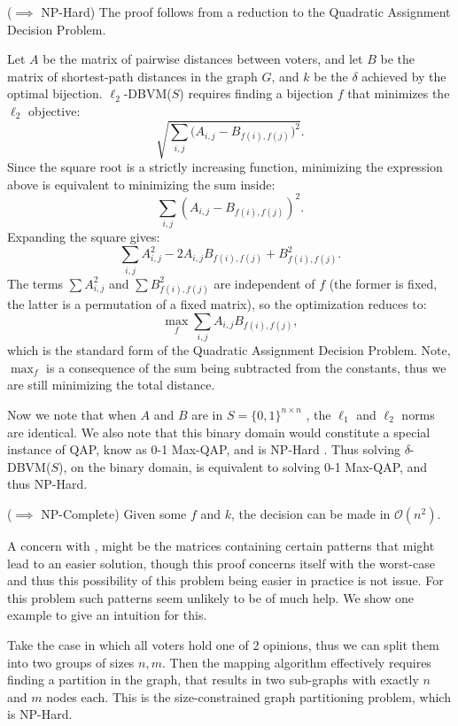 \begin{proofc}{}
	($\implies$ NP-Hard) The proof follows from a reduction to the Quadratic Assignment Decision Problem.

	Let $A$ be the matrix of pairwise distances between voters, and let $B$ be the matrix of shortest-path distances in the graph $G$, and $k$ be the $\delta$ achieved by the optimal bijection. $\ell_2$-DBVM($S$) requires finding a bijection $f$ that minimizes the $\ell_2$ objective:
	$$
		\sqrt{\sum_{i,j} \bigl(A_{i,j} - B_{f(i),f(j)}\bigr)^2}.
	$$
	Since the square root is a strictly increasing function, minimizing the expression above is equivalent to minimizing the sum inside:
	$$
		\sum_{i,j} (A_{i,j} - B_{f(i),f(j)})^2.
	$$
	Expanding the square gives:
	$$
		\sum_{i,j} A_{i,j}^2 - 2 A_{i,j} B_{f(i),f(j)} + B_{f(i),f(j)}^2.
	$$
	The terms $\sum A_{i,j}^2$ and $\sum B_{f(i),f(j)}^2$ are independent of $f$ (the former is fixed, the latter is a permutation of a fixed matrix), so the optimization reduces to:
	$$
		\max_f \sum_{i,j} A_{i,j} B_{f(i),f(j)},
	$$
	which is the standard form of the Quadratic Assignment Decision Problem. Note, $\max_f$ is a consequence of the sum being subtracted from the constants, thus we are still minimizing the total distance.

	Now we note that when $A$ and $B$ are in $S= \{0,1\}^{n \times n}$ , the
	$\ell_1$ and $\ell_2$ norms are identical. We also note that this binary
	domain would constitute a special instance of QAP, know as 0-1 Max-QAP, and
	is NP-Hard \cite{nagarajanMaximumQuadraticAssignment}. Thus solving
	$\delta$-DBVM($S$), on the binary domain, is equivalent to solving 0-1
	Max-QAP, and thus NP-Hard.~\checkmark


	($\implies$ NP-Complete) Given some $f$ and $k$, the decision can be made in $\mathcal{O}(n^2)$.~\checkmark


\end{proofc}

A concern with , might be the matrices
containing certain patterns that might lead to an easier solution, though this
proof concerns itself with the worst-case and thus this possibility of this
problem being easier in practice is not issue. For this problem such patterns
seem unlikely to be of much help. We show one example to give an intuition for
this.

Take the case in which all voters hold one of 2 opinions, thus we can split
them into two groups of sizes $n, m$. Then the mapping algorithm
effectively requires finding a partition in the graph, that results in two
sub-graphs with exactly $n$ and $m$ nodes each. This is the
size-constrained graph partitioning problem, which is NP-Hard.

